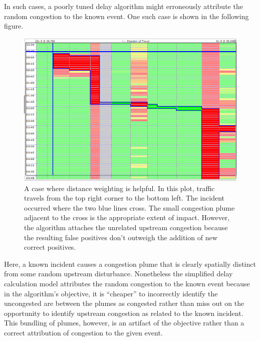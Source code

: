 \documentclass[12pt]{report}
\newcounter{time}
\newcounter{space}
\begin{document}
In such cases, a poorly tuned delay algorithm might erroneously
attribute the random congestion to the known event.  One such case is
shown in the following figure.
\begin{figure}[t]
  \begin{center}
    \includegraphics[width=\textwidth]{images/distance-weighting-helpful.png}
    \caption[A case where distance weighting is helpful]{A case where distance
      weighting is helpful.  In this plot, traffic travels from the top right
      corner to the bottom left.  The incident occurred where the two blue lines
      cross.  The small congestion plume adjacent to the cross is the
      appropriate extent of impact.  However, the algorithm attaches the
      unrelated upstream congestion because the resulting false positives don't
      outweigh the addition of new correct positives.}
    \label{fig:time-space-random-versus-known}
  \end{center}
\end{figure}
Here, a known incident causes a congestion plume that is clearly
spatially distinct from some random upstream disturbance.  Nonetheless
the simplified delay calculation model attributes the random
congestion to the known event because in the algorithm's objective, it
is ``cheaper'' to incorrectly identify the uncongested are between the
plumes as congested rather than miss out on the opportunity to
identify upstream congestion as related to the known incident.  This
bundling of plumes, however, is an artifact of the objective rather
than a correct attribution of congestion to the given event.
\end{document}
